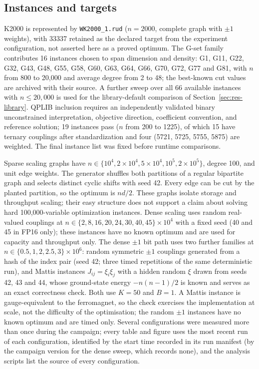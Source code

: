 \documentclass[11pt,a4paper]{article}
\newcommand{\code}[1]{\texttt{#1}}
\begin{document}
\subsection{Instances and targets}\label{sec:instances}
K2000 is represented by \code{WK2000\_1.rud} ($n=2000$, complete graph with $\pm1$ weights), with 33337 retained as the declared target from the experiment configuration, not asserted here as a proved optimum. The G-set family \cite{gset} contributes 16 instances chosen to span dimension and density: G1, G11, G22, G32, G43, G48, G55, G58, G60, G63, G64, G66, G70, G72, G77 and G81, with $n$ from 800 to 20,000 and average degree from 2 to 48; the best-known cut values are archived with their source. A further sweep over all 66 available instances with $n\le 20{,}000$ is used for the library-default comparison of Section~\ref{sec:res-library}. QPLIB inclusion requires an independently validated binary unconstrained interpretation, objective direction, coefficient convention, and reference solution; 19 instances pass ($n$ from 200 to 1225), of which 15 have ternary couplings after standardization and four (5721, 5725, 5755, 5875) are weighted. The final instance list was fixed before runtime comparisons.

Sparse scaling graphs have $n\in\{10^4,2\times10^4,5\times10^4,10^5,2\times10^5\}$, degree 100, and unit edge weights. The generator shuffles both partitions of a regular bipartite graph and selects distinct cyclic shifts with seed 42. Every edge can be cut by the planted partition, so the optimum is $nd/2$. These graphs isolate storage and throughput scaling; their easy structure does not support a claim about solving hard 100,000-variable optimization instances. Dense scaling uses random real-valued couplings at $n\in\{2,8,16,20,24,30,40,45\}\times10^4$ with a fixed seed (40 and 45 in FP16 only); these instances have no known optimum and are used for capacity and throughput only. The dense $\pm1$ bit path uses two further families at $n\in\{0.5,1,2,2.5,3\}\times10^6$: random symmetric $\pm1$ couplings generated from a hash of the index pair (seed 42; three timed repetitions of the same deterministic run), and Mattis instances $J_{ij}=\xi_i\xi_j$ with a hidden random $\xi$ drawn from seeds 42, 43 and 44, whose ground-state energy $-n(n-1)/2$ is known and serves as an exact correctness check. Both use $K=50$ and $B=1$. A Mattis instance is gauge-equivalent to the ferromagnet, so the check exercises the implementation at scale, not the difficulty of the optimisation; the random $\pm1$ instances have no known optimum and are timed only. Several configurations were measured more than once during the campaign; every table and figure uses the most recent run of each configuration, identified by the start time recorded in its run manifest (by the campaign version for the dense sweep, which records none), and the analysis scripts list the source of every configuration.
\end{document}
